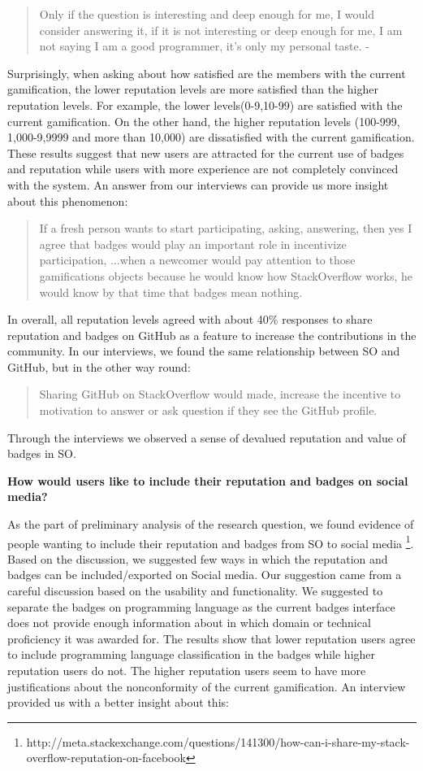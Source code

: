 \documentclass{sigchi}
\begin{document}
\blockquote{Only if the question is interesting and deep enough for me, I would consider answering it, if it is not interesting or deep enough for me, I am not saying I am a good programmer, it’s only my personal taste. - }

Surprisingly, when asking about how satisfied are the members with the current gamification, the lower reputation levels are more satisfied than the higher reputation levels. For example, the lower levels(0-9,10-99) are satisfied with the current gamification. On the other hand, the higher  reputation levels (100-999, 1,000-9,9999 and more than 10,000) are dissatisfied with the current gamification. These results suggest that new users are attracted for the current use of badges and reputation while users with more experience are not completely convinced with the system. An answer from our interviews can provide us more insight about this phenomenon: 

\blockquote{If a fresh person wants to start participating, asking, answering, then yes I agree that badges would play an important role in incentivize participation, ...when a newcomer would pay attention to those gamifications objects because he would know how StackOverflow works, he would know by that time that badges mean nothing.}

In overall, all reputation levels agreed with about 40\% responses to share reputation and badges on GitHub as a feature to increase the contributions in the community. In our interviews, we found the same relationship between SO and GitHub, but in the other way round: 

\blockquote{Sharing GitHub on StackOverflow would made, increase the incentive to motivation to answer or ask question if they see the GitHub profile. }

Through the interviews we observed a sense of devalued reputation and value of badges in SO.

\textbf{How would users like to include their reputation and badges on social media?}

As the part of preliminary analysis of the research question, we found evidence of people wanting to include their reputation and badges from SO to social media \footnote{http://meta.stackexchange.com/questions/141300/how-can-i-share-my-stack-overflow-reputation-on-facebook}. Based on the discussion, we suggested few ways in which the reputation and badges can be included/exported on Social media. Our suggestion came from a careful discussion based on the usability and functionality. We suggested to separate the badges on programming language as the current badges interface does not provide enough information about in which domain or technical proficiency it was awarded for. The results show that lower reputation users agree to include programming language classification in the badges while higher reputation users do not. The higher reputation users seem to have more justifications about the nonconformity of the current gamification. An interview provided us with  a better insight about this: 
\end{document}
